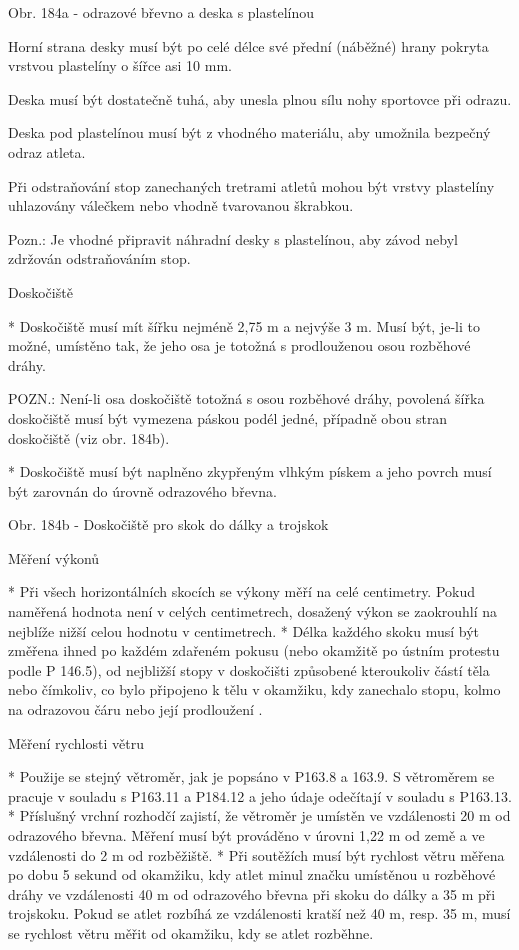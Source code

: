 Obr. 184a - odrazové břevno a deska s plastelínou

Horní strana desky musí být po celé délce své přední (náběžné) hrany pokryta vrstvou plastelíny o šířce asi 10 mm.

Deska musí být dostatečně tuhá, aby unesla plnou sílu nohy sportovce při odrazu.

Deska pod plastelínou musí být z vhodného materiálu, aby umožnila bezpečný odraz atleta.

Při odstraňování stop zanechaných tretrami atletů mohou být vrstvy plastelíny uhlazovány válečkem nebo vhodně tvarovanou škrabkou.

Pozn.: Je vhodné připravit náhradní desky s plastelínou, aby závod nebyl zdržován odstraňováním stop.

Doskočiště

* Doskočiště musí mít šířku nejméně 2,75 m a nejvýše 3 m. Musí být, je-li to možné, umístěno tak, že jeho osa je totožná s prodlouženou osou rozběhové dráhy.

POZN.: Není-li osa doskočiště totožná s osou rozběhové dráhy, povolená šířka doskočiště musí být vymezena páskou podél jedné, případně obou stran doskočiště (viz obr. 184b).

* Doskočiště musí být naplněno zkypřeným vlhkým pískem a jeho povrch musí být zarovnán do úrovně odrazového břevna.

Obr. 184b - Doskočiště pro skok do dálky a trojskok

Měření výkonů

* Při všech horizontálních skocích se výkony měří na celé centimetry. Pokud naměřená hodnota není v celých centimetrech, dosažený výkon se zaokrouhlí na nejblíže nižší celou hodnotu v centimetrech.
* Délka každého skoku musí být změřena ihned po každém zdařeném pokusu (nebo okamžitě po ústním protestu podle P 146.5), od nejbližší stopy v doskočišti způsobené kteroukoliv částí těla nebo čímkoliv, co bylo připojeno k tělu v okamžiku, kdy zanechalo stopu, kolmo na odrazovou čáru nebo její prodloužení .

Měření rychlosti větru

* Použije se stejný větroměr, jak je popsáno v P163.8 a 163.9. S větroměrem se pracuje v souladu s P163.11 a P184.12 a jeho údaje odečítají v souladu s P163.13.
* Příslušný vrchní rozhodčí zajistí, že větroměr je umístěn ve vzdálenosti 20 m od odrazového břevna. Měření musí být prováděno v úrovni 1,22 m od země a ve vzdálenosti do 2 m od rozběžiště.
* Při soutěžích musí být rychlost větru měřena po dobu 5 sekund od okamžiku, kdy atlet minul značku umístěnou u rozběhové dráhy ve vzdálenosti 40 m od odrazového břevna při skoku do dálky a 35 m při trojskoku. Pokud se atlet rozbíhá ze vzdálenosti kratší než 40 m, resp. 35 m, musí se rychlost větru měřit od okamžiku, kdy se atlet rozběhne.
\enditems

